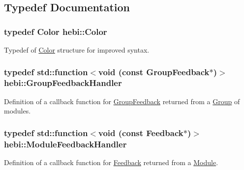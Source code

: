 \subsection{Typedef Documentation}
\subsubsection[{\texorpdfstring{Color}{Color}}]{\setlength{\rightskip}{0pt plus 5cm}typedef {\bf Color} {\bf hebi\+::\+Color}}\hypertarget{namespacehebi_a17b5d397bfee3f6a79256d661b3033ae}{}\label{namespacehebi_a17b5d397bfee3f6a79256d661b3033ae}


Typedef of \hyperlink{structhebi_1_1Color}{Color} structure for improved syntax. 

\subsubsection[{\texorpdfstring{Group\+Feedback\+Handler}{GroupFeedbackHandler}}]{\setlength{\rightskip}{0pt plus 5cm}typedef std\+::function$<$void (const {\bf Group\+Feedback}$\ast$)$>$ {\bf hebi\+::\+Group\+Feedback\+Handler}}\hypertarget{namespacehebi_a0f7ebf2775f29bf8c6eb5f9c590ffdb4}{}\label{namespacehebi_a0f7ebf2775f29bf8c6eb5f9c590ffdb4}


Definition of a callback function for \hyperlink{classhebi_1_1GroupFeedback}{Group\+Feedback} returned from a \hyperlink{classhebi_1_1Group}{Group} of modules. 

\subsubsection[{\texorpdfstring{Module\+Feedback\+Handler}{ModuleFeedbackHandler}}]{\setlength{\rightskip}{0pt plus 5cm}typedef std\+::function$<$void (const {\bf Feedback}$\ast$)$>$ {\bf hebi\+::\+Module\+Feedback\+Handler}}\hypertarget{namespacehebi_acce4dce21ce8c5055ba13532c2355b67}{}\label{namespacehebi_acce4dce21ce8c5055ba13532c2355b67}


Definition of a callback function for \hyperlink{classhebi_1_1Feedback}{Feedback} returned from a \hyperlink{classhebi_1_1Module}{Module}. 

